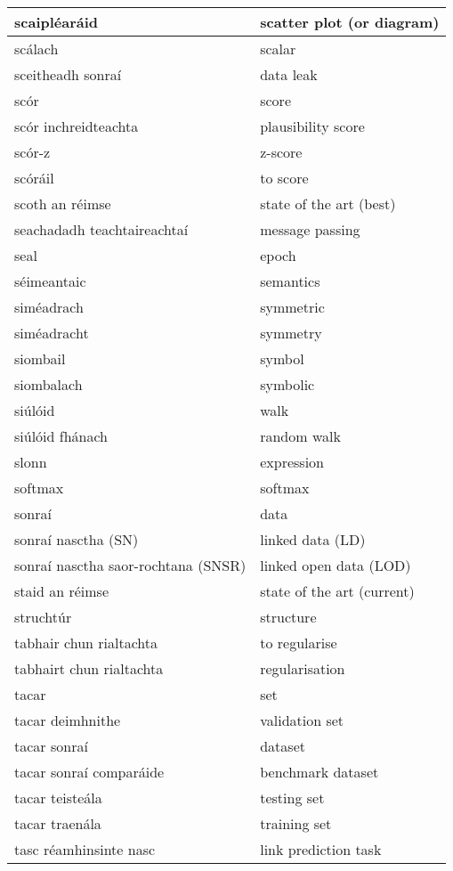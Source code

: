 \documentclass{article}
\begin{document}
\begin{longtable}{|l|l|}
		scaipléaráid&scatter plot (or diagram)\\ \hline 
		scálach&scalar\\ \hline 
		sceitheadh sonraí&data leak\\ \hline 
		scór&score\\ \hline 
		scór inchreidteachta&plausibility score\\ \hline 
		scór-z&z-score\\ \hline 
		scóráil&to score\\ \hline 
		scoth an réimse&state of the art (best)\\ \hline 
		seachadadh teachtaireachtaí&message passing\\ \hline 
		seal&epoch\\ \hline 
		séimeantaic&semantics\\ \hline 
		siméadrach&symmetric\\ \hline 
		siméadracht&symmetry\\ \hline 
		siombail&symbol\\ \hline 
		siombalach&symbolic\\ \hline 
		siúlóid&walk\\ \hline 
		siúlóid fhánach&random walk\\ \hline 
		slonn&expression\\ \hline 
		softmax&softmax\\ \hline 
		sonraí&data\\ \hline 
		sonraí nasctha (SN)&linked data (LD)\\ \hline 
		sonraí nasctha saor-rochtana (SNSR)&linked open data (LOD)\\ \hline 
		staid an réimse&state of the art (current)\\ \hline 
		struchtúr&structure\\ \hline 
		tabhair chun rialtachta&to regularise\\ \hline 
		tabhairt chun rialtachta&regularisation\\ \hline 
		tacar&set\\ \hline 
		tacar deimhnithe&validation set\\ \hline 
		tacar sonraí&dataset\\ \hline 
		tacar sonraí comparáide&benchmark dataset\\ \hline 
		tacar teisteála&testing set\\ \hline 
		tacar traenála&training set\\ \hline 
		tasc réamhinsinte nasc&link prediction task\\ \hline 

\end{longtable}
\end{document}
